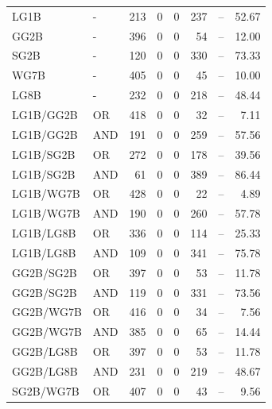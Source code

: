 \documentclass{article}
\begin{document}
{\begin{longtable}{llrrrrrr}
LG1B                     & -       &  213 &    0 &    0 &  237 & --    & 52.67             \\
 GG2B                     & -       &  396 &    0 &    0 &   54 & --    & 12.00             \\
 SG2B                     & -       &  120 &    0 &    0 &  330 & --    & 73.33             \\
 WG7B                     & -       &  405 &    0 &    0 &   45 & --    & 10.00             \\
 LG8B                     & -       &  232 &    0 &    0 &  218 & --    & 48.44             \\
 LG1B/GG2B                & OR      &  418 &    0 &    0 &   32 & --    & 7.11              \\
 LG1B/GG2B                & AND     &  191 &    0 &    0 &  259 & --    & 57.56             \\
 LG1B/SG2B                & OR      &  272 &    0 &    0 &  178 & --    & 39.56             \\
 LG1B/SG2B                & AND     &   61 &    0 &    0 &  389 & --    & 86.44             \\
 LG1B/WG7B                & OR      &  428 &    0 &    0 &   22 & --    & 4.89              \\
 LG1B/WG7B                & AND     &  190 &    0 &    0 &  260 & --    & 57.78             \\
 LG1B/LG8B                & OR      &  336 &    0 &    0 &  114 & --    & 25.33             \\
 LG1B/LG8B                & AND     &  109 &    0 &    0 &  341 & --    & 75.78             \\
 GG2B/SG2B                & OR      &  397 &    0 &    0 &   53 & --    & 11.78             \\
 GG2B/SG2B                & AND     &  119 &    0 &    0 &  331 & --    & 73.56             \\
 GG2B/WG7B                & OR      &  416 &    0 &    0 &   34 & --    & 7.56              \\
 GG2B/WG7B                & AND     &  385 &    0 &    0 &   65 & --    & 14.44             \\
 GG2B/LG8B                & OR      &  397 &    0 &    0 &   53 & --    & 11.78             \\
 GG2B/LG8B                & AND     &  231 &    0 &    0 &  219 & --    & 48.67             \\
 SG2B/WG7B                & OR      &  407 &    0 &    0 &   43 & --    & 9.56              \\

\end{longtable}}
\end{document}
